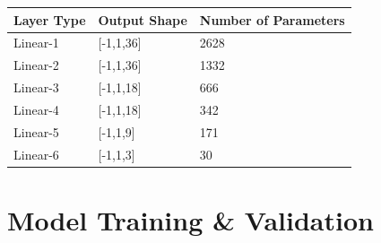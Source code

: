 \documentclass[a4paper,12pt]{article}
\begin{document}
	\begin{table}[H]
		\centering
		\begin{tabular}{@{}lll@{}}
			\toprule
			Layer Type & Output Shape & Number of Parameters \\ \midrule
			Linear-1   & [-1,1,36]    & 2628                 \\
			Linear-2   & [-1,1,36]    & 1332                 \\
			Linear-3   & [-1,1,18]    & 666                  \\
			Linear-4   & [-1,1,18]    & 342                  \\
			Linear-5   & [-1,1,9]     & 171                  \\
			Linear-6   & [-1,1,3]     & 30                   \\ \bottomrule
		\end{tabular}
	\end{table}
	
	\section{Model Training \& Validation}
	
\end{document}
